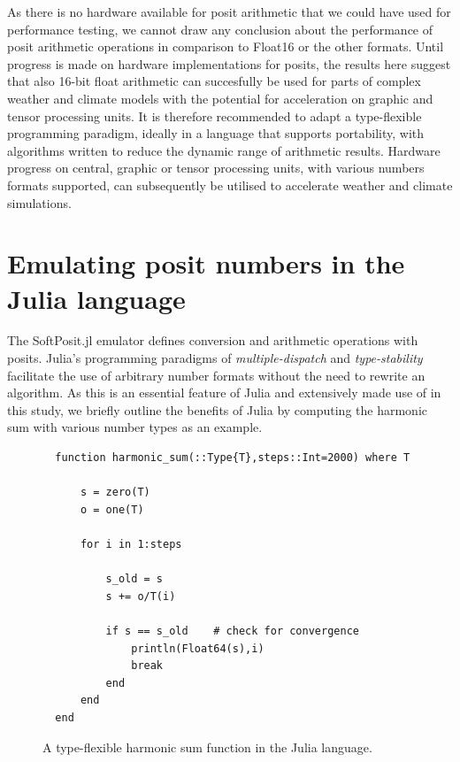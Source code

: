 \documentclass[draft]{agujournal2019}
\begin{document}
As there is no hardware available for posit arithmetic that we could have used for performance testing, we cannot draw any conclusion about the performance of posit arithmetic operations in comparison to Float16 or the other formats.
Until progress is made on hardware implementations for posits, the results here suggest that also 16-bit float arithmetic can succesfully be used for parts of complex weather and climate models with the potential for acceleration on graphic and tensor processing units.
It is therefore recommended to adapt a type-flexible programming paradigm, ideally in a language that supports portability, with algorithms written to reduce the dynamic range of arithmetic results.
Hardware progress on central, graphic or tensor processing units, with various numbers formats supported, can subsequently be utilised to accelerate weather and climate simulations.

\appendix
\section{Emulating posit numbers in the Julia language}
\label{sec:julia}

The SoftPosit.jl emulator defines conversion and arithmetic operations with posits. Julia's programming paradigms of \emph{multiple-dispatch} and \emph{type-stability} facilitate the use of arbitrary number formats without the need to rewrite an algorithm. As this is an essential feature of Julia and extensively made use of in this study, we briefly outline the benefits of Julia by computing the harmonic sum with various number types as an example.

\begin{figure}[h]
\small
\begin{verbatim}
  function harmonic_sum(::Type{T},steps::Int=2000) where T

      s = zero(T)
      o = one(T)

      for i in 1:steps

          s_old = s
          s += o/T(i)

          if s == s_old    # check for convergence
              println(Float64(s),i)
              break
          end
      end
  end
\end{verbatim}
\caption{A type-flexible harmonic sum function in the Julia language.}
\label{fig:harmsum}
\end{figure}
\end{document}
